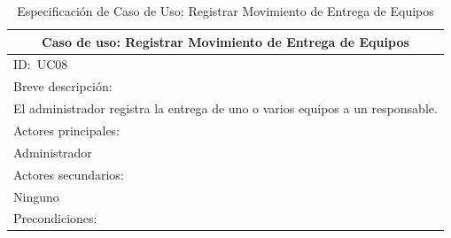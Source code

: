 \documentclass[stu, 12pt, letterpaper, donotrepeattitle, floatsintext, natbib]{apa7}
\begin{document}
\begin{longtable}{@{} p{16.5cm} @{}}
    \caption{Especificación de Caso de Uso: Registrar Movimiento de Entrega de Equipos}\label{tab:UC08}                                                                                                                    \\ \toprule
    \multicolumn{1}{c}{Caso de uso: Registrar Movimiento de Entrega de Equipos}                                                                                                                                            \\ \midrule
    ID:~UC08                                                                                                                                                                                                               \\ \midrule
    Breve descripción:                                                                                                                                                                                                     \\
    El administrador registra la entrega de uno o varios equipos a un responsable.                                                                                                                                         \\ \midrule
    Actores principales:                                                                                                                                                                                                   \\
    Administrador                                                                                                                                                                                                          \\ \midrule
    Actores secundarios:                                                                                                                                                                                                   \\
    Ninguno                                                                                                                                                                                                                \\ \midrule
    Precondiciones:                                                                                                                                                                                                        \\

\end{longtable}
\end{document}

